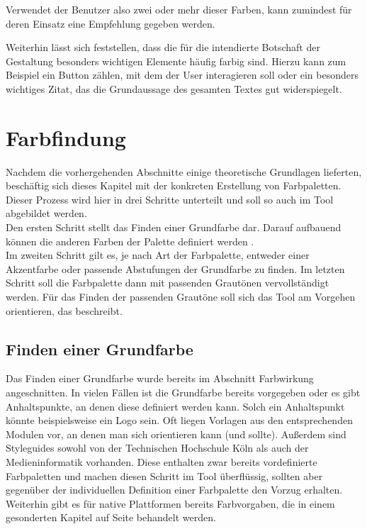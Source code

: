 Verwendet der Benutzer also zwei oder mehr dieser Farben, kann zumindest für deren Einsatz eine Empfehlung gegeben werden.

Weiterhin lässt sich feststellen, dass die für die intendierte Botschaft der Gestaltung besonders wichtigen Elemente häufig farbig sind. Hierzu kann zum Beispiel ein Button zählen, mit dem der User interagieren soll oder ein besonders wichtiges Zitat, das die Grundaussage des gesamten Textes gut widerspiegelt.


\section{Farbfindung}

Nachdem die vorhergehenden Abschnitte einige theoretische Grundlagen lieferten, beschäftig sich dieses Kapitel mit der konkreten Erstellung von Farbpaletten. Dieser Prozess wird hier in drei Schritte unterteilt und soll so auch im Tool abgebildet werden. \\
Den ersten Schritt stellt das Finden einer Grundfarbe dar. Darauf aufbauend können die anderen Farben der Palette definiert werden . \\
Im zweiten Schritt gilt es, je nach Art der Farbpalette, entweder einer Akzentfarbe oder passende Abstufungen der Grundfarbe zu finden. Im letzten Schritt soll die Farbpalette dann mit passenden Grautönen vervollständigt werden. Für das Finden der passenden Grautöne soll sich das Tool am Vorgehen orientieren, das \cite{elizabeth2016simple} beschreibt.

\subsection{Finden einer Grundfarbe}

Das Finden einer Grundfarbe wurde bereits im Abschnitt Farbwirkung angeschnitten. In vielen Fällen ist die Grundfarbe bereits vorgegeben oder es gibt Anhaltspunkte, an denen diese definiert werden kann. Solch ein Anhaltspunkt könnte beispielsweise ein Logo sein.
Oft liegen Vorlagen aus den entsprechenden Modulen vor, an denen man sich orientieren kann (und sollte). Außerdem sind Styleguides sowohl von der Technischen Hochschule Köln als  auch der Medieninformatik vorhanden. Diese enthalten zwar bereits vordefinierte Farbpaletten und machen diesen Schritt im Tool überflüssig, sollten aber gegenüber der individuellen Definition einer Farbpalette den Vorzug erhalten. Weiterhin gibt es für native Plattformen bereits Farbvorgaben, die in einem gesonderten Kapitel auf Seite \pageref{androidios} behandelt werden.


